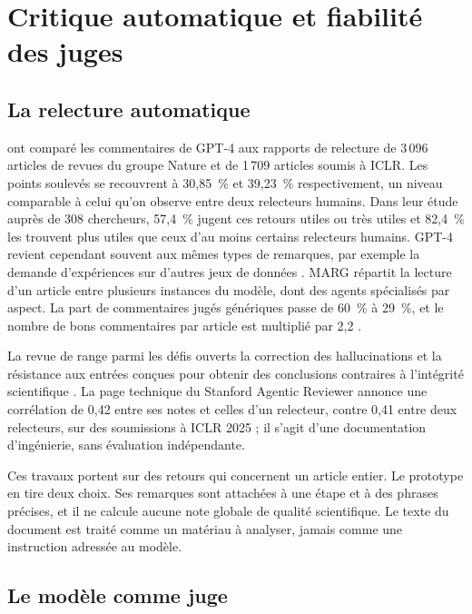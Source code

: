 \section{Critique automatique et fiabilité des juges}
\label{sec:critique}

\subsection{La relecture automatique}

\textcite{ref18} ont comparé les commentaires de GPT-4 aux rapports de relecture de 3\,096 articles de revues du groupe Nature et de 1\,709 articles soumis à ICLR. Les points soulevés se recouvrent à 30,85~\% et 39,23~\% respectivement, un niveau comparable à celui qu’on observe entre deux relecteurs humains. Dans leur étude auprès de 308 chercheurs, 57,4~\% jugent ces retours utiles ou très utiles et 82,4~\% les trouvent plus utiles que ceux d’au moins certains relecteurs humains. GPT-4 revient cependant souvent aux mêmes types de remarques, par exemple la demande d’expériences sur d’autres jeux de données \parencite[1]{ref18}. MARG \parencite{ref19} répartit la lecture d’un article entre plusieurs instances du modèle, dont des agents spécialisés par aspect. La part de commentaires jugés génériques passe de 60~\% à 29~\%, et le nombre de bons commentaires par article est multiplié par 2,2 \parencite[1]{ref19}.

La revue de \textcite{ref20} range parmi les défis ouverts la correction des hallucinations et la résistance aux entrées conçues pour obtenir des conclusions contraires à l’intégrité scientifique \parencite[25--26]{ref20}. La page technique du Stanford Agentic Reviewer \parencite{ref21} annonce une corrélation de 0,42 entre ses notes et celles d’un relecteur, contre 0,41 entre deux relecteurs, sur des soumissions à ICLR 2025 ; il s’agit d’une documentation d’ingénierie, sans évaluation indépendante.

Ces travaux portent sur des retours qui concernent un article entier. Le prototype en tire deux choix. Ses remarques sont attachées à une étape et à des phrases précises, et il ne calcule aucune note globale de qualité scientifique. Le texte du document est traité comme un matériau à analyser, jamais comme une instruction adressée au modèle.

\subsection{Le modèle comme juge}

